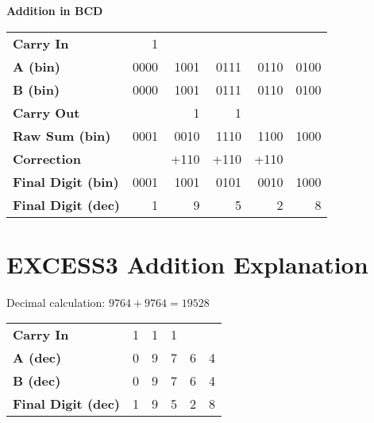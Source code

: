 \vspace{0.3cm}

\textbf{Addition in BCD}
\vspace{0.3cm}

\begin{tabular}{l|rrrrr}
\textbf{Carry In} &  {\scriptsize 1}  &  {\scriptsize }  &  {\scriptsize }  &  {\scriptsize }  &  {\scriptsize }  \\
\textbf{A (bin)} &  0000  &  1001  &  0111  &  0110  &  0100  \\
\textbf{B (bin)} &  0000  &  1001  &  0111  &  0110  &  0100 \\\hline

\textbf{Carry Out} &  {\scriptsize }   &  {\scriptsize 1}   &  {\scriptsize 1}   &  {\scriptsize }   &  {\scriptsize }   \\
\textbf{Raw Sum (bin)} &  0001  &  0010  &  1110  &  1100  &  1000  \\
\textbf{Correction} &   &   +110  &   +110  &   +110  &   \\
\hline

\textbf{Final Digit (bin)} &  0001  &  1001  &  0101  &  0010  &  1000  \\
\textbf{Final Digit (dec)} &  1  &  9  &  5  &  2  &  8  \\
\end{tabular}




  
\section*{ EXCESS3 Addition Explanation }

Decimal calculation: $9764 + 9764 = 19528$

\vspace{0.3cm}

\begin{tabular}{l|rrrrr}
\textbf{Carry In} &  {\scriptsize 1}  &  {\scriptsize 1}  &  {\scriptsize 1}  &  {\scriptsize }  &  {\scriptsize }  \\
\textbf{A (dec)} &  0  &  9  &  7  &  6  &  4  \\
\textbf{B (dec)} &  0  &  9  &  7  &  6  &  4  \\
\hline
\textbf{Final Digit (dec)} &  1  &  9  &  5  &  2  &  8  \\
\end{tabular}

\vspace{0.3cm}

